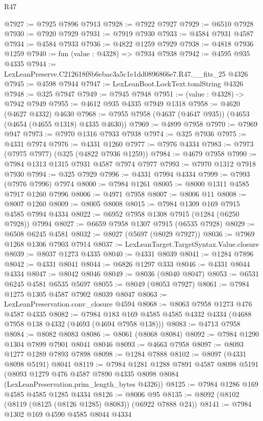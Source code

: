 \begin{lexlean}{R47}
\begin{coremodule}
@7927 := @7925 @7896 @7913
@7928 := @7922 @7927
@7929 := @6510 @7928
@7930 := @7920 @7929
@7931 := @7919 @7930
@7933 := @4584 @7931 @4587
@7934 := @4584 @7933
@7936 := @4822 @1259 @7929
@7938 := @4818 @7936 @1259
@7940 := fun (value : @4328) => @7934 @7938
@7942 := @4595 @935 @4335
@7944 := LexLeanPreserve.C212618f8b6ebac3a5c1e1dd0896866e7.R47.__fits_25 @4326
@7945 := @4598 @7944
@7947 := LexLeanBoot.LockText.tomlString @4326
@7948 := @325 @7947
@7949 := @7945 @7948
@7951 := (value : @4328) -> @7942 @7949
@7955 := @4612 @935 @4335 @7949 @1318
@7958 := @4620 (@4627 @4332) @4630
@7968 := @7955 @7958 (@4637 (@4647 @935)) (@4653 (@4654 (@4655 @1318) @4335 @4630))
@7969 := @4899 @7958
@7970 := @7969 @947
@7973 := @7970 @1316 @7933 @7938
@7974 := @325 @7936
@7975 := @4331 @7974
@7976 := @4331 @1260
@7977 := @7976 @4334
@7983 := @7973 (@7975 @7977) (@325 (@4822 @7936 @1259))
@7984 := @4679 @7958
@7990 := @7984 @1313 @1315 @7931 @4587 @7974 @7977
@7993 := @7970 @1312 @7918 @7930
@7994 := @325 @7929
@7996 := @4331 @7994 @4334
@7999 := @7993 (@7976 @7996) @7974
@8000 := @7984 @1261
@8005 := @8000 @1311 @4585 @7917 @1260 @7996
@8006 := @4971 @7958
@8007 := @8006 @11
@8008 := @8007 @1260
@8009 := @8005 @8008
@8015 := @7984 @1309 @169 @7915 @4585 @7994 @4334
@8022 := @6952 @7958 @1308 @7915 (@1284 (@6250 @7928)) @7994
@8027 := @6659 @7958 @1307 @7915 (@6535 @7928)
@8029 := @6508 @6245 @4581
@8032 := @8027 (@5697 (@8029 @7927))
@8036 := @7969 @1268 @1306 @7903 @7914
@8037 := LexLeanTarget.TargetSyntax.Value.closure
@8039 := @8037 @1273 @4335
@8040 := @4331 @8039
@8041 := @1284 @7896
@8042 := @4331 @8041
@8044 := @6826 @1297 @333
@8046 := @4331 @8044 @4334
@8047 := @8042 @8046
@8049 := @8036 (@8040 @8047)
@8053 := @6531 @6245 @4581 @6535 @5697
@8055 := @8049 (@8053 @7927)
@8061 := @7984 @1275 @1305 @4587 @7902 @8039 @8047
@8063 := LexLeanPreservation.conv_closure @4594
@8068 := @8063 @7958 @1273 @476 @4587 @4335
@8082 := @7984 @183 @169 @4585 @4585 @4332 @4334 (@4688 @7958 @138 @4332 (@4693 (@4694 @7958 @138)))
@8083 := @4713 @7958
@8084 := @8082 @8083
@8086 := @8061 (@8068 @8084)
@8092 := @7984 @1290 @1304 @7899 @7901 @8041 @8046
@8093 := @4663 @7958
@8097 := @8093 @1277 @1289 @7893 @7898
@8098 := @1284 @7888
@8102 := @8097 (@4331 @8098 @5191) @8041
@8119 := @7984
    @1281
    @1288
    @7891
    @4587
    @8098
    @5191
    (@8093 @1279 @476 @4587 @7890 @4335 @8098 @8084 (LexLeanPreservation.prim_length_bytes @4326))
@8125 := @7984 @1286 @169 @4585 @4585 @1285 @4334
@8126 := @8006 @95
@8135 := @8092 (@8102 (@8119 (@8125 (@8126 @1285) @8083)) (@6922 @7888 @24))
@8141 := @7984 @1302 @169 @4590 @4585 @8044 @4334

\end{coremodule}
\end{lexlean}
